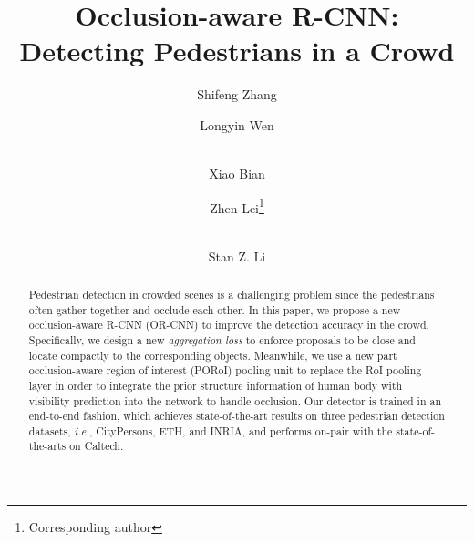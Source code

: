 \documentclass[runningheads]{llncs}
\def\ie{{\em i.e.}}
\begin{document}
\title{Occlusion-aware R-CNN: \\ Detecting Pedestrians in a Crowd}

\author{Shifeng Zhang \and
Longyin Wen \and\\
Xiao Bian \and
Zhen Lei\thanks{Corresponding author} \and\\
Stan Z. Li}


\maketitle

\begin{abstract}
Pedestrian detection in crowded scenes is a challenging problem since the pedestrians often gather together and occlude each other. In this paper, we propose a new occlusion-aware R-CNN (OR-CNN) to improve the detection accuracy in the crowd. Specifically, we design a new {\em aggregation loss} to enforce proposals to be close and locate compactly to the corresponding objects. Meanwhile, we use a new part occlusion-aware region of interest (PORoI) pooling unit to replace the RoI pooling layer in order to integrate the prior structure information of human body with visibility prediction into the network to handle occlusion. Our detector is trained in an end-to-end fashion, which achieves state-of-the-art results on three pedestrian detection datasets, \ie, CityPersons, ETH, and INRIA, and performs on-pair with the state-of-the-arts on Caltech.

\end{abstract}
\end{document}
